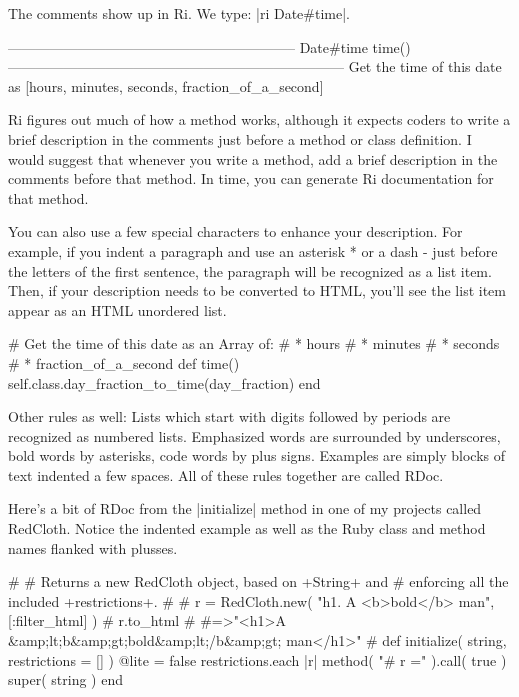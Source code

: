 \documentclass[12pt,twoside]{report}
\begin{document}
The comments show up in Ri. We type: \consoleinline|ri Date#time|.

\begin{consolecode}
 -------------------------------------------------------------- Date#time
      time()
 ------------------------------------------------------------------------
      Get the time of this date as [hours, minutes, seconds,
      fraction_of_a_second]
\end{consolecode}

Ri figures out much of how a method works, although it expects coders
to write a brief description in the comments just before a method or
class definition. I would suggest that whenever you write a method,
add a brief description in the comments before that method. In time,
you can generate Ri documentation for that method.

You can also use a few special characters to enhance your
description. For example, if you indent a paragraph and use an
asterisk * or a dash - just before the letters of the first sentence,
the paragraph will be recognized as a list item. Then, if your
description needs to be converted to HTML, you'll see the list item
appear as an HTML unordered list.

\begin{rubycode}
 # Get the time of this date as an Array of:
 # * hours
 # * minutes
 # * seconds
 # * fraction_of_a_second
 def time() self.class.day_fraction_to_time(day_fraction) end
\end{rubycode}

Other rules as well: Lists which start with digits followed by periods
are recognized as numbered lists. Emphasized words are surrounded by
underscores, bold words by asterisks, code words by plus
signs. Examples are simply blocks of text indented a few spaces. All
of these rules together are called RDoc.

Here's a bit of RDoc from the \rubyinline|initialize|
method in one of my projects called RedCloth. Notice the indented
example as well as the Ruby class and method names flanked with
plusses.

\begin{rubycode}
 #
 # Returns a new RedCloth object, based on +String+ and
 # enforcing all the included +restrictions+.
 #
 #   r = RedCloth.new( "h1. A <b>bold</b> man", [:filter_html] )
 #   r.to_html
 #     #=>"<h1>A &amp;lt;b&amp;gt;bold&amp;lt;/b&amp;gt; man</h1>" 
 #
 def initialize( string, restrictions = [] )
     @lite = false
     restrictions.each { |r| method( "#{ r }=" ).call( true ) }
     super( string )
 end
\end{rubycode}
\end{document}

